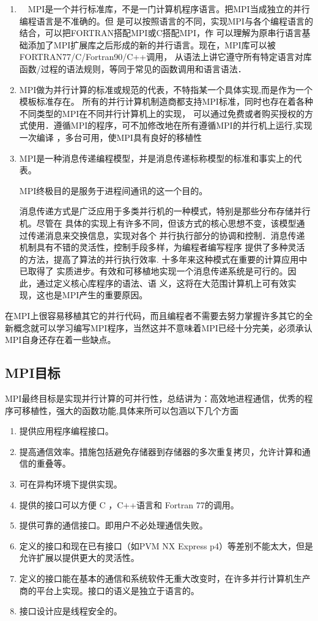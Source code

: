 \begin{enumerate}
\item　MPI是一个并行标准库，不是一门计算机程序语言。把MPI当成独立的并行编程语言是不准确的。但
是可以按照语言的不同，实现MPI与各个编程语言的结合，可以把FORTRAN搭配MPI或C搭配MPI，作
可以理解为原串行语言基础添加了MPI扩展库之后形成的新的并行语言。现在，MPI库可以被FORTRAN77/C/Fortran90/C++调用，
从语法上讲它遵守所有特定语言对库函数/过程的语法规则，等同于常见的函数调用和语言语法．
\item MPI做为并行计算的标准或规范的代表，不特指某一个具体实现,而是作为一个模板标准存在。
所有的并行计算机制造商都支持MPI标准，同时也存在着各种不同类型的MPI在不同并行计算机上的实现，
可以通过免费或者购买授权的方式使用．遵循MPI的程序，可不加修改地在所有遵循MPI的并行机上运行,实现一次编译
，多台可用，使MPI具有良好的移植性
\item MPI是一种消息传递编程模型，并是消息传递标称模型的标准和事实上的代表。

MPI终极目的是服务于进程间通讯的这一个目的。

消息传递方式是广泛应用于多类并行机的一种模式，特别是那些分布存储并行机。尽管在
具体的实现上有许多不同，但该方式的核心思想不变，该模型通过传递消息来交换信息，实现对各个
并行执行部分的协调和控制．消息传递机制具有不错的灵活性，控制手段多样，为编程者编写程序
提供了多种灵活的方法，提高了算法的并行执行效率.  十多年来这种模式在重要的计算应用中已取得了
实质进步。有效和可移植地实现一个消息传递系统是可行的。因此，通过定义核心库程序的语法、语
义，这将在大范围计算机上可有效实现，这也是MPI产生的重要原因。
\end{enumerate}

在MPI上很容易移植其它的并行代码，而且编程者不需要去努力掌握许多其它的全新概念就可以学习编写MPI程序，当然这并不意味着MPI已经十分完美，必须承认MPI自身还存在着一些缺点。

\subsection{MPI目标}
MPI最终目标是实现并行计算的可并行性，总结讲为：高效地进程通信，优秀的程序可移植性，强大的函数功能,具体来所可以包涵以下几个方面

\begin{enumerate}
\item 提供应用程序编程接口。
\item 提高通信效率。措施包括避免存储器到存储器的多次重复拷贝，允许计算和通信的重叠等。
\item 可在异构环境下提供实现。
\item 提供的接口可以方便 C ，C++语言和 Fortran 77的调用。
\item 提供可靠的通信接口。即用户不必处理通信失败。
\item 定义的接口和现在已有接口（如PVM NX Express p4）等差别不能太大，但是允许扩展以提供更大的灵活性。
\item 定义的接口能在基本的通信和系统软件无重大改变时，在许多并行计算机生产商的平台上实现。接口的语义是独立于语言的。
\item 接口设计应是线程安全的。
\end{enumerate}

